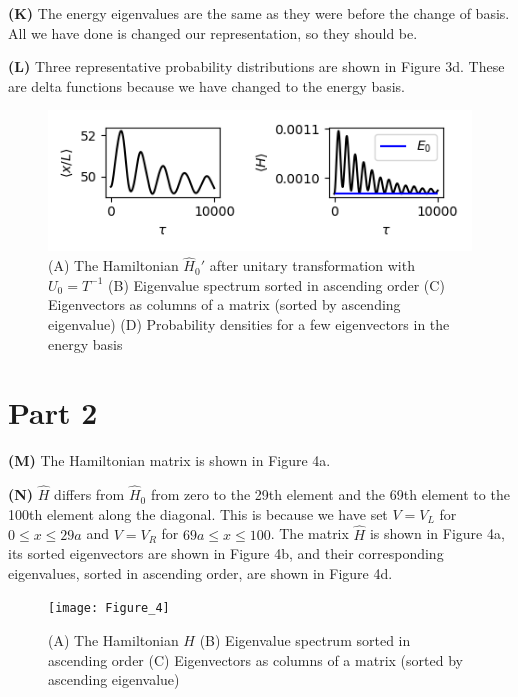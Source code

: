 \documentclass[12pt]{article}
\theoremstyle{definition}
\begin{document}
{\vspace{0.1in}
\noindent \textbf{(K)} The energy eigenvalues are the same as they were before the change of basis. All we have done is changed our representation, so they should be. 

\vspace{0.1in}
\noindent \textbf{(L)} Three representative probability distributions are shown in Figure 3d. These are delta functions because we have changed to the energy basis.

\begin{figure}[t!]
\centering
\includegraphics[width=15cm]{Figure_3}
\caption{(A) The Hamiltonian $\hat{H}_{0}'$ after unitary transformation with $U_{0}=T^{-1}$ (B) Eigenvalue spectrum sorted in ascending order (C) Eigenvectors as columns of a matrix (sorted by ascending eigenvalue) (D) Probability densities for a few eigenvectors in the energy basis}
\label{fig:method}
\end{figure}

\section{Part 2}

\vspace{0.1in}
\noindent \textbf{(M)} The Hamiltonian matrix is shown in Figure 4a.

\vspace{0.1in}
\noindent \textbf{(N)} $\hat{H}$ differs from $\hat{H}_{0}$ from zero to the 29th element and the 69th element to the 100th element along the diagonal. This is because we have set $V=V_{L}$ for $0 \leq x \leq 29a$ and $V=V_{R}$ for $69a\leq x \leq 100$. The matrix $\hat{H}$ is shown in Figure 4a, its sorted eigenvectors are shown in Figure 4b, and their corresponding eigenvalues, sorted in ascending order, are shown in Figure 4d. 

\begin{figure}[t!]
\centering
\texttt{[image: Figure\_4]}
\caption{(A) The Hamiltonian $H$ (B) Eigenvalue spectrum sorted in ascending order (C) Eigenvectors as columns of a matrix (sorted by ascending eigenvalue)}
\label{fig:method}
\end{figure}

}
\end{document}
